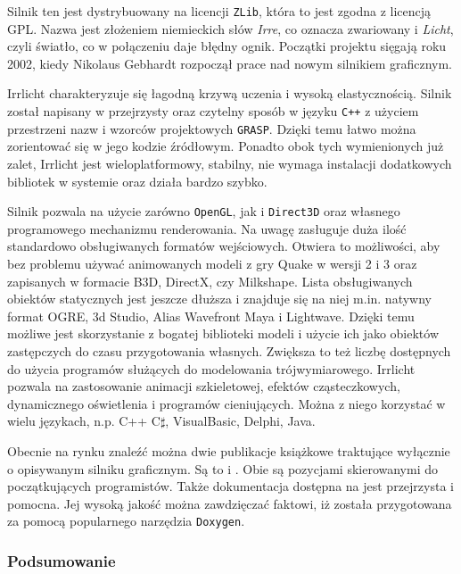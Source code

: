 \documentclass[11pt]{mwrep}
\begin{document}
      Silnik ten jest dystrybuowany na licencji \texttt{ZLib}, która to jest zgodna z licencją GPL. Nazwa jest złożeniem niemieckich słów \textit{Irre}, co oznacza zwariowany i \textit{Licht}, czyli światło, co w połączeniu daje błędny ognik. Początki projektu sięgają roku 2002, kiedy Nikolaus Gebhardt rozpoczął prace nad nowym silnikiem graficznym.

      Irrlicht charakteryzuje się łagodną krzywą uczenia i wysoką elastycznością. Silnik został napisany w przejrzysty oraz czytelny sposób w języku \texttt{C++} z użyciem przestrzeni nazw i wzorców projektowych \texttt{GRASP}. Dzięki temu łatwo można zorientować się w jego kodzie źródłowym. Ponadto obok tych wymienionych już zalet, Irrlicht jest wieloplatformowy, stabilny, nie wymaga instalacji dodatkowych bibliotek w systemie oraz działa bardzo szybko.

      Silnik pozwala na użycie zarówno \texttt{OpenGL}, jak i \texttt{Direct3D} oraz własnego programowego mechanizmu renderowania. Na uwagę zasługuje duża ilość standardowo obsługiwanych formatów wejściowych. Otwiera to możliwości, aby bez problemu używać animowanych modeli z gry Quake w wersji 2 i 3 oraz zapisanych w formacie B3D, DirectX, czy Milkshape. Lista obsługiwanych obiektów statycznych jest jeszcze dłuższa i znajduje się na niej m.in. natywny format OGRE, 3d Studio, Alias Wavefront Maya i Lightwave. Dzięki temu możliwe jest skorzystanie z bogatej biblioteki modeli i użycie ich jako obiektów zastępczych do czasu przygotowania własnych. Zwiększa to też liczbę dostępnych do użycia programów służących do modelowania trójwymiarowego. Irrlicht pozwala na zastosowanie animacji szkieletowej, efektów cząsteczkowych, dynamicznego oświetlenia i programów cieniujących. Można z niego korzystać w wielu językach, n.p. C++ C$\sharp$, VisualBasic, Delphi, Java.

       Obecnie na rynku znaleźć można dwie publikacje książkowe traktujące wyłącznie o opisywanym silniku graficznym. Są to \cite{irrlichtb1} i \cite{irrlichtb2}. Obie są pozycjami skierowanymi do początkujących programistów. Także dokumentacja dostępna na \cite{irrlichtw} jest przejrzysta i pomocna. Jej wysoką jakość można zawdzięczać faktowi, iż została przygotowana za pomocą popularnego narzędzia \texttt{Doxygen}.

      \subsubsection{Podsumowanie}
\end{document}
